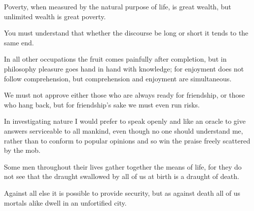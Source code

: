 \documentclass{stex}
\begin{document}
\vspace{0.5em}
\begin{sparagraph}[title=25]
  Poverty, when measured by the natural purpose of life, is great wealth, but unlimited wealth is great poverty.
\end{sparagraph}

\vspace{0.5em}
\begin{sparagraph}[title=26]
  You must understand that whether the discourse be long or short it tends to the same end.
\end{sparagraph}

\vspace{0.5em}
\begin{sparagraph}[title=27]
  In all other occupations the fruit comes painfully after completion, but in philosophy pleasure goes hand in hand with knowledge; for enjoyment does not follow comprehension, but comprehension and enjoyment are simultaneous.
\end{sparagraph}

\vspace{0.5em}
\begin{sparagraph}[title=28]
  We must not approve either those who are always ready for friendship, or those who hang back, but for friendship’s sake we must even run risks.
\end{sparagraph}

\vspace{0.5em}
\begin{sparagraph}[title=29]
  In investigating nature I would prefer to speak openly and like an oracle to give answers serviceable to all mankind, even though no one should understand me, rather than to conform to popular opinions and so win the praise freely scattered by the mob.
\end{sparagraph}

\vspace{0.5em}
\begin{sparagraph}[title=30]
  Some men throughout their lives gather together the means of life, for they do not see that the draught swallowed by all of us at birth is a draught of death.
\end{sparagraph}

\vspace{0.5em}
\begin{sparagraph}[title=31]
  Against all else it is possible to provide security, but as against death all of us mortals alike dwell in an unfortified city.
\end{sparagraph}
\end{document}
